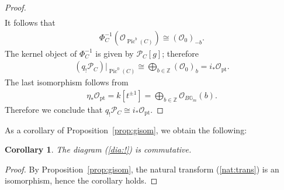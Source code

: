 \documentclass[11pt,oneside,a4paper,mathscr]{amsart}
\newtheorem{cor}[thm]{Corollary}
\theoremstyle{definition}
\newcommand{\Pic}{\operatorname{Pic}}
\newcommand{\cP}{\mathcal{P}}
\newcommand{\bgm}{B\mathbb{G}_m}
\begin{document}
\begin{proof}
\begin{align*}
\end{align*}
It follows that
\begin{align*}
\Phi_C^{-1}(\mathcal{O}_{\Pic^b(C)})
\cong
(\mathcal{O}_0)_{-b}.
\end{align*}
The kernel object of $\Phi_C^{-1}$ is given by $\cP_C[g]$; therefore
\begin{align*}
(q_{!}\cP_C)|_{\Pic^0(C)}
\cong
\bigoplus_{b\in \mathbb{Z}}(\mathcal{O}_0)_b
=
i_{*}\mathcal{O}_{\mathrm{pt}}.
\end{align*}
The last isomorphism follows from
\begin{align*}
\eta_{*}\mathcal{O}_{\mathrm{pt}}
=
k[t^{\pm 1}]
=
\bigoplus_{b\in \mathbb{Z}}\mathcal{O}_{\bgm}(b).
\end{align*}
Therefore we conclude that
$
q_! \cP_C \cong i_{*}\mathcal{O}_{\mathrm{pt}}.
$
\end{proof}

As a corollary of Proposition~\ref{prop:gisom}, we obtain the following: 
\begin{cor}\label{cor:dialeft}
    The diagram (\ref{dia:!}) is commutative. 
\end{cor}
\begin{proof}
By Proposition~\ref{prop:gisom}, the natural transform (\ref{nat:trans}) is an isomorphism, hence the corollary holds. 
\end{proof}
\end{document}

